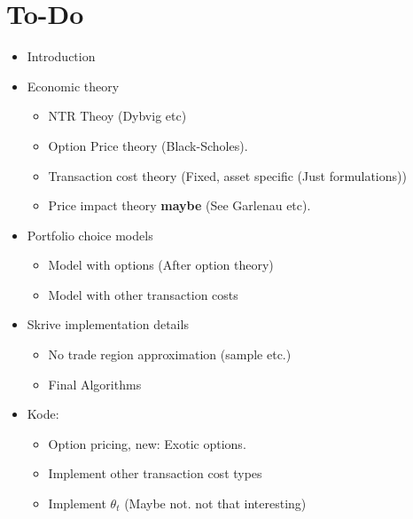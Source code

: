 \documentclass[11pt]{article}
\begin{document}
\section{To-Do}\label{sec:To-Do}
\begin{itemize}
  \item Introduction
  \item Economic theory
      \begin{itemize}
        \item NTR Theoy (Dybvig etc)
        \item Option Price theory (Black-Scholes). 
        \item Transaction cost theory (Fixed, asset specific (Just formulations))
        \item Price impact theory \textbf{maybe} (See Garlenau etc).
      \end{itemize}
  \item Portfolio choice models
      \begin{itemize}
        \item Model with options (After option theory)
        \item Model with other transaction costs
      \end{itemize}
  \item Skrive implementation details
      \begin{itemize}
        \item No trade region approximation (sample etc.)
        \item Final Algorithms 
      \end{itemize}
  \item Kode:
    \begin{itemize}
      \item Option pricing, new: Exotic options.
      \item Implement other transaction cost types
      \item Implement $\theta_t$ (Maybe not. not that interesting)
    \end{itemize}  
\end{itemize}





% 


\newpage

\begingroup 
  \hypersetup{linkcolor=black}

  \hypersetup{
    colorlinks=true,
    citecolor=black,
    linkcolor=black,
    filecolor=black, 
    urlcolor=black}
  \printbibliography
\endgroup

\newpage


\end{document}
